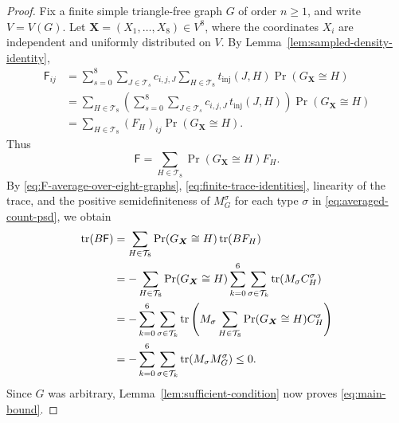 \begin{proof}
Fix a finite simple triangle-free graph $G$ of order $n\geq1$,
and write $V=V(G)$.
Let $\boldsymbol{X}=(X_1,\ldots,X_8)\in V^8$, where the coordinates
$X_i$ are independent and uniformly distributed on $V$.
By Lemma~\ref{lem:sampled-density-identity},
\begin{align*}
\mathsf F_{ij}
&=\sum_{s=0}^8\sum_{J\in\mathcal T_s}c_{i,j,J}
\sum_{H\in\mathcal T_8}t_{\mathrm{inj}}(J,H)
\Pr(G_{\boldsymbol{X}}\cong H)\\
&=\sum_{H\in\mathcal T_8}
\left(\sum_{s=0}^8\sum_{J\in\mathcal T_s}
c_{i,j,J}\,t_{\mathrm{inj}}(J,H)\right)
\Pr(G_{\boldsymbol{X}}\cong H)\\
&=\sum_{H\in\mathcal T_8}(F_H)_{ij}
\Pr(G_{\boldsymbol{X}}\cong H).
\end{align*}
Thus
\begin{equation}\label{eq:F-average-over-eight-graphs}
\mathsf F=\sum_{H\in\mathcal T_8}
\Pr(G_{\boldsymbol{X}}\cong H)F_H.
\end{equation}
By \eqref{eq:F-average-over-eight-graphs},
\eqref{eq:finite-trace-identities}, linearity of the trace, and the
positive semidefiniteness of $M_G^\sigma$ for each type $\sigma$ in
\eqref{eq:averaged-count-psd}, we obtain
\begin{equation}\label{eq:trace-flag-decomposition}
\begin{aligned}
\operatorname{tr}(B\mathsf F)
&=\sum_{H\in\mathcal T_8}\Pr(G_{\boldsymbol{X}}\cong H)\operatorname{tr}(BF_H)\\
&=-\sum_{H\in\mathcal T_8}\Pr(G_{\boldsymbol{X}}\cong H)
\sum_{k=0}^6\sum_{\sigma\in\mathcal T_k}
\operatorname{tr}(M_\sigma C_H^\sigma)\\
&=-\sum_{k=0}^6\sum_{\sigma\in\mathcal T_k}
\operatorname{tr}\left(M_\sigma\sum_{H\in\mathcal T_8}
\Pr(G_{\boldsymbol{X}}\cong H)C_H^\sigma\right)\\
&=-\sum_{k=0}^6\sum_{\sigma\in\mathcal T_k}
\operatorname{tr}(M_\sigma M_G^\sigma)\leq0.
\end{aligned}
\end{equation}
Since $G$ was arbitrary, Lemma~\ref{lem:sufficient-condition} now
proves \eqref{eq:main-bound}.
\end{proof}

